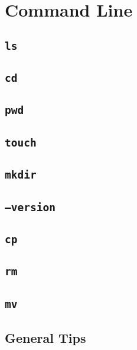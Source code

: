 \chapter{Command Line}

\section{\texttt{ls}}

\section{\texttt{cd}}

\section{\texttt{pwd}}

\section{\texttt{touch}}

\section{\texttt{mkdir}}

\section{\texttt{--version}}

\section{\texttt{cp}}

\section{\texttt{rm}}

\section{\texttt{mv}}

\section{General Tips}


